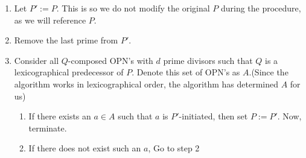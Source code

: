 \documentclass[../paper.tex]{subfiles}
\begin{document}
\begin{enumerate}[label*=\arabic*.]

  \item Let $P' := P$. This is so we do not modify the original
        $P$ during the procedure, as we will reference $P$.  

  \item Remove the last prime from $P'$.

  \item \label{fail_loop}
        Consider all $Q$-composed OPN's with $d$ prime divisors
such
        that $Q$ is a lexicographical predecessor of $P$. Denote
        this set of OPN's as $A$.(Since the algorithm works in
        lexicographical order, the algorithm has determined $A$
        for us)

  \begin{enumerate}[label*=\arabic*.]

    \item If there exists an $a \in A$ such that $a$ is
    $P'$-initiated, then set $P := P'$. Now, terminate.

    \item If there does not exist such an $a$, Go to step 2

  \end{enumerate}

\end{enumerate}
\end{document}
